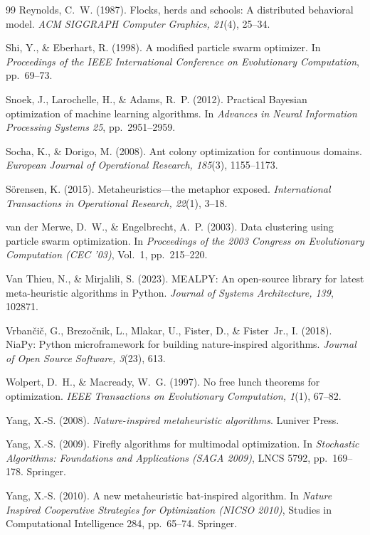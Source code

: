 \documentclass[11pt,a4paper]{article}
\begin{document}
\begin{thebibliography}{99}
Reynolds, C.~W. (1987).
Flocks, herds and schools: A distributed behavioral model.
\emph{ACM SIGGRAPH Computer Graphics, 21}(4), 25--34.

Shi, Y., \& Eberhart, R. (1998).
A modified particle swarm optimizer.
In \emph{Proceedings of the IEEE International Conference on Evolutionary Computation}, pp.~69--73.

Snoek, J., Larochelle, H., \& Adams, R.~P. (2012).
Practical Bayesian optimization of machine learning algorithms.
In \emph{Advances in Neural Information Processing Systems 25}, pp.~2951--2959.

Socha, K., \& Dorigo, M. (2008).
Ant colony optimization for continuous domains.
\emph{European Journal of Operational Research, 185}(3), 1155--1173.

S{\"o}rensen, K. (2015).
Metaheuristics---the metaphor exposed.
\emph{International Transactions in Operational Research, 22}(1), 3--18.

van der Merwe, D.~W., \& Engelbrecht, A.~P. (2003).
Data clustering using particle swarm optimization.
In \emph{Proceedings of the 2003 Congress on Evolutionary Computation (CEC '03)}, Vol.~1, pp.~215--220.

Van Thieu, N., \& Mirjalili, S. (2023).
MEALPY: An open-source library for latest meta-heuristic algorithms in Python.
\emph{Journal of Systems Architecture, 139}, 102871.

Vrban{\v{c}}i{\v{c}}, G., Brezo{\v{c}}nik, L., Mlakar, U., Fister, D., \& Fister~Jr., I. (2018).
NiaPy: Python microframework for building nature-inspired algorithms.
\emph{Journal of Open Source Software, 3}(23), 613.

Wolpert, D.~H., \& Macready, W.~G. (1997).
No free lunch theorems for optimization.
\emph{IEEE Transactions on Evolutionary Computation, 1}(1), 67--82.

Yang, X.-S. (2008).
\emph{Nature-inspired metaheuristic algorithms}.
Luniver Press.

Yang, X.-S. (2009).
Firefly algorithms for multimodal optimization.
In \emph{Stochastic Algorithms: Foundations and Applications (SAGA 2009)}, LNCS 5792, pp.~169--178. Springer.

Yang, X.-S. (2010).
A new metaheuristic bat-inspired algorithm.
In \emph{Nature Inspired Cooperative Strategies for Optimization (NICSO 2010)}, Studies in Computational Intelligence 284, pp.~65--74. Springer.

\end{thebibliography}
\end{document}

